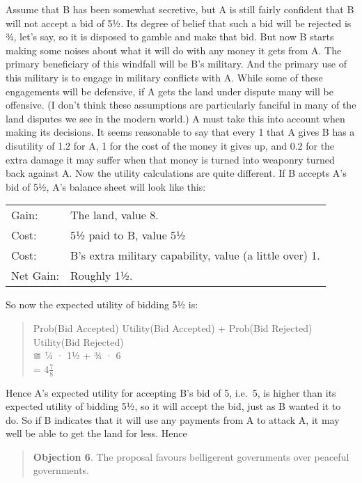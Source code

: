 \documentclass[
  10pt,
  letterpaper,
  DIV=11,
  numbers=noendperiod,
  twoside]{scrartcl}
\begin{document}
Assume that B has been somewhat secretive, but A is still fairly
confident that B will not accept a bid of 5½. Its degree of belief that
such a bid will be rejected is ¾, let's say, so it is disposed to gamble
and make that bid. But now B starts making some noises about what it
will do with any money it gets from A. The primary beneficiary of this
windfall will be B's military. And the primary use of this military is
to engage in military conflicts with A. While some of these engagements
will be defensive, if A gets the land under dispute many will be
offensive. (I don't think these assumptions are particularly fanciful in
many of the land disputes we see in the modern world.) A must take this
into account when making its decisions. It seems reasonable to say that
every 1 that A gives B has a disutility of 1.2 for A, 1 for the cost of
the money it gives up, and 0.2 for the extra damage it may suffer when
that money is turned into weaponry turned back against A. Now the
utility calculations are quite different. If B accepts A's bid of 5½,
A's balance sheet will look like this:

\begin{longtable}[]{@{}ll@{}}
\toprule\noalign{}
\endhead
\bottomrule\noalign{}
\endlastfoot
Gain: & The land, value 8. \\
Cost: & 5½ paid to B, value 5½ \\
Cost: & B's extra military capability, value (a little over) 1. \\
Net Gain: & Roughly 1½. \\
\end{longtable}

So now the expected utility of bidding 5½ is:

\begin{quote}
Prob(Bid Accepted) Utility(Bid Accepted) + Prob(Bid Rejected)
Utility(Bid Rejected)\\
≅ ¼ · 1½ + ¾ · 6\\
= 4\(\frac{7}{8}\)
\end{quote}

Hence A's expected utility for accepting B's bid of 5, i.e.~5, is higher
than its expected utility of bidding 5½, so it will accept the bid, just
as B wanted it to do. So if B indicates that it will use any payments
from A to attack A, it may well be able to get the land for less. Hence

\begin{quote}
\textbf{Objection 6}. The proposal favours belligerent governments over
peaceful governments.
\end{quote}
\end{document}
